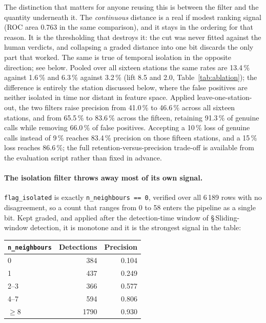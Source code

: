 \documentclass[review,3p,times]{elsarticle}
\begin{document}
The distinction that matters for anyone reusing this is between the filter and
the quantity underneath it. The \emph{continuous} distance is a real if modest
ranking signal (ROC area 0.763 in the same comparison), and it stays in the
ordering for that reason. It is the thresholding that destroys it: the cut was
never fitted against the human verdicts, and collapsing a graded distance into
one bit discards the only part that worked. The same is true of temporal
isolation in the opposite direction; see below. Pooled over all sixteen stations the same
rates are 13.4\,\% against 1.6\,\% and 6.3\,\% against 3.2\,\% (lift 8.5 and
2.0, Table~\ref{tab:ablation}); the difference is entirely the station discussed
below, where the false positives are neither isolated in time nor distant in
feature space. Applied leave-one-station-out, the two filters raise precision
from 41.0\,\% to 46.6\,\% across all sixteen stations, and from 65.5\,\% to
83.6\,\% across the fifteen, retaining 91.3\,\% of genuine calls while removing
66.0\,\% of false positives. Accepting a 10\,\% loss of genuine calls instead of
9\,\% reaches 83.4\,\% precision on those fifteen stations, and a 15\,\% loss
reaches 86.6\,\%; the full retention-versus-precision trade-off is available
from the evaluation script rather than fixed in advance.

\paragraph{The isolation filter throws away most of its own signal.}
\texttt{flag\_isolated} is exactly \texttt{n\_neighbours == 0}, verified over
all 6\,189 rows with no disagreement, so a count that ranges from 0 to 58
enters the pipeline as a single bit. Kept graded, and applied after the
detection-time window of \S\,Sliding-window detection, it is monotone and it is
the strongest signal in the table:

\begin{center}
\begin{tabular}{lrr}
\toprule
\texttt{n\_neighbours} & Detections & Precision \\
\midrule
0     &  384 & 0.104 \\
1     &  437 & 0.249 \\
2--3  &  366 & 0.577 \\
4--7  &  594 & 0.806 \\
$\geq$8 & 1790 & 0.930 \\
\bottomrule
\end{tabular}
\end{center}
\end{document}
